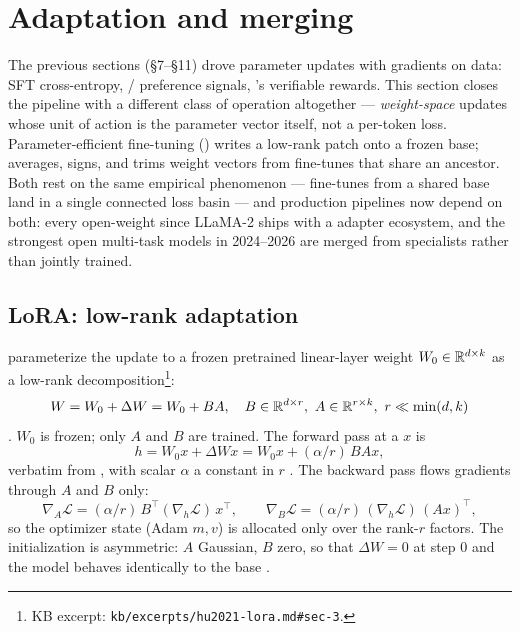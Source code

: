 
\section{Adaptation and merging}
\label{sec:adaptation-and-merging}
\label{sec:adaptation}

The previous sections (\S7--\S11) drove parameter updates with gradients
on data: SFT cross-entropy, / preference signals, 's
verifiable rewards. This section closes the pipeline with a different
class of operation altogether — \emph{weight-space} updates whose unit
of action is the parameter vector itself, not a per-token loss.
Parameter-efficient fine-tuning () writes a low-rank patch onto a
frozen base;  averages, signs, and trims weight vectors
from fine-tunes that share an ancestor. Both rest on the same
empirical phenomenon — fine-tunes from a shared base land in a single
connected loss basin — and production pipelines now depend on both: every
open-weight  since LLaMA-2 ships with a  adapter ecosystem, and
the strongest open multi-task models in 2024--2026 are merged from
specialists rather than jointly trained.

\subsection{LoRA: low-rank adaptation}
\label{sec:adapt-lora}

\citet{hu2021-lora} parameterize the update to a frozen pretrained
linear-layer weight $W_0 \in \mathbb{R}^{d \times k}$ as a low-rank
decomposition\footnote{KB excerpt:
\nolinkurl{kb/excerpts/hu2021-lora.md#sec-3}.}:
\begin{equation}
W = W_0 + \Delta W = W_0 + B A,
\quad
B \in \mathbb{R}^{d \times r},\ A \in \mathbb{R}^{r \times k},\ r \ll \min(d, k)
\label{eq:lora-decomp}
\end{equation}
\citep[\S 3]{hu2021-lora}. $W_0$ is frozen; only $A$ and $B$ are
trained. The forward pass at a  $x$ is
\begin{equation}
h = W_0 x + \Delta W x = W_0 x + (\alpha / r)\, B A x,
\label{eq:lora-fwd}
\end{equation}
verbatim from \citet[\S 3]{hu2021-lora}, with scalar
$\alpha$ a constant in $r$ \citep[\S 3]{hu2021-lora}. The backward pass
flows gradients through $A$ and $B$ only:
\begin{equation}
\nabla_A \mathcal{L} = (\alpha/r)\, B^\top (\nabla_h \mathcal{L})\, x^\top,
\qquad
\nabla_B \mathcal{L} = (\alpha/r)\, (\nabla_h \mathcal{L})\, (A x)^\top,
\label{eq:lora-grad}
\end{equation}
so the optimizer state (Adam $m, v$) is allocated only over the rank-$r$
factors. The initialization is asymmetric: $A$ Gaussian, $B$ zero, so
that $\Delta W = 0$ at step 0 and the model behaves identically to the
base \citep[\S 3]{hu2021-lora}.

